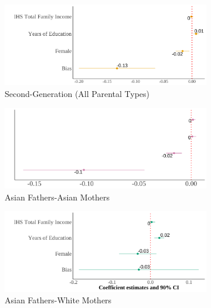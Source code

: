 \begin{center}
\begin{figure}[!htb]
\centering
\caption{Relationship Between Self-Reported Asian Identity and Bias: By Parental Types Among Adults}
\label{plot01-regression-byparent-adults}
\begin{subfigure}{.48\textwidth}
\caption{Second-Generation (All Parental Types)}
\centering
\includegraphics[width=.9\linewidth]{by-parents-regs-all-adults.png}
\end{subfigure}
\centering
\begin{subfigure}{.48\textwidth}
\caption{Asian Fathers-Asian Mothers}
\centering
\includegraphics[width=.9\linewidth]{by-parents-regs-hh-adults.png}
\end{subfigure}
\begin{subfigure}{.48\textwidth}
\caption{Asian Fathers-White Mothers}
\centering
\includegraphics[width=.9\linewidth]{by-parents-regs-hw-adults.png}
\end{subfigure}
\begin{subfigure}{.48\textwidth}

\end{subfigure}
\end{figure}
\end{center}

